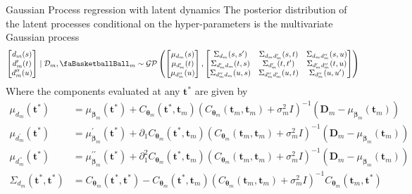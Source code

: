 \documentclass[ignorenonframetext,xcolor=pdflatex,table,dvipsnames,serif]{beamer}
\newcommand{\BTheta}{\text{\faBasketballBall}}
\begin{document}
\begin{frame}{Gaussian Process regression with latent dynamics}
The posterior distribution of the latent processes conditional on the hyper-parameters is the multivariate Gaussian process
{
\scriptsize
\begin{align*}
\begin{bmatrix}d_m(s)\\ d_m^\prime(t)\\ d_m^{\prime\prime}(u)\end{bmatrix} \mid \mathcal{D}_m, \BTheta_m \sim \mathcal{GP}\left(\begin{bmatrix}\mu_{d_m}(s)\\ \mu_{d_m^\prime}(t)\\ \mu_{d_m^{\prime\prime}}(u)\end{bmatrix}, \begin{bmatrix} \Sigma_{d_m}(s, s^\prime) & \Sigma_{d_m d_m^\prime}(s,t) & \Sigma_{d_m d_m^{\prime\prime}}(s,u)\\ \Sigma_{d_m^\prime d_m}(t,s) & \Sigma_{d_m^\prime}(t,t^\prime) & \Sigma_{d_m^\prime d_m^{\prime\prime}}(t,u)\\ \Sigma_{d_m^{\prime\prime} d_m}(u,s) & \Sigma_{d_m^{\prime\prime} d_m^\prime}(u,t) & \Sigma_{d_m^{\prime\prime}}(u,u^\prime)\end{bmatrix}\right)
\end{align*}	
}
\pause
Where the components evaluated at any $\mathbf{t}^\ast$ are given by
{
\tiny
\begin{align*}
  \mu_{d_m}(\mathbf{t}^\ast) &= \mu_{\bm{\beta}_m}(\mathbf{t}^\ast) + C_{\bm{\theta}_m}(\mathbf{t}^\ast, \mathbf{t}_m)\left(C_{\bm{\theta}_m}(\mathbf{t}_m, \mathbf{t}_m) + \sigma^2_m I\right)^{-1}\left(\mathbf{D}_m - \mu_{\bm{\beta}_m}(\mathbf{t}_m)\right)\\
  \mu_{d_m^\prime}(\mathbf{t}^\ast) &= \mu^\prime_{\bm{\beta}_m}(\mathbf{t}^\ast) + \partial_1 C_{\bm{\theta}_m}(\mathbf{t}^\ast, \mathbf{t}_m)\left(C_{\bm{\theta}_m}(\mathbf{t}_m, \mathbf{t}_m) + \sigma^2_m I\right)^{-1}\left(\mathbf{D}_m - \mu_{\bm{\beta}_m}(\mathbf{t}_m)\right) \\
  \mu_{d_m^{\prime\prime}}(\mathbf{t}^\ast) &= \mu^{\prime\prime}_{\bm{\beta}_m}(\mathbf{t}^\ast) + \partial_1^2 C_{\bm{\theta}_m}(\mathbf{t}^\ast, \mathbf{t}_m)\left(C_{\bm{\theta}_m}(\mathbf{t}_m, \mathbf{t}_m) + \sigma^2_m I\right)^{-1}\left(\mathbf{D}_m - \mu_{\bm{\beta}_m}(\mathbf{t}_m)\right)\\
  \Sigma_{d_m}(\mathbf{t}^\ast, \mathbf{t}^\ast) &= C_{\bm{\theta}_m}(\mathbf{t}^\ast, \mathbf{t}^\ast) - C_{\bm{\theta}_m}(\mathbf{t}^\ast, \mathbf{t}_m)\left(C_{\bm{\theta}_m}(\mathbf{t}_m, \mathbf{t}_m) + \sigma^2_m I\right)^{-1} C_{\bm{\theta}_m}(\mathbf{t}_m, \mathbf{t}^\ast)\\

\end{align*}}
\end{frame}
\end{document}
